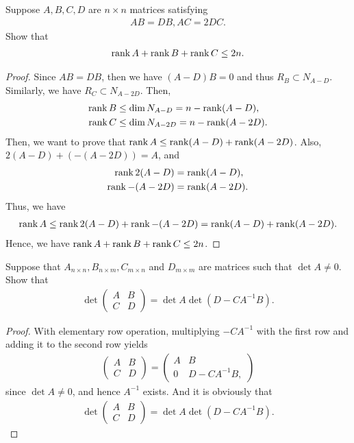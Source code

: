 \documentclass[12pt]{article}
\begin{document}
\medskip

Suppose $A, B, C, D$ are $n \times n$ matrices satisfying
\begin{align*}
    AB = DB, AC = 2 DC.
\end{align*}
Show that
\begin{align*}
    \rank A + \rank B + \rank C \leq 2n.
\end{align*}
\begin{proof}
Since $AB = DB$, then we have $(A - D)B = 0$ and thus $R_B \subset N_{A-D}$. Similarly, we have $R_C \subset N_{A-2D}$. Then,
\begin{align*}
    \rank B & \leq \dim N_{A - D} = n -  \rank (A - D), \\
    \rank C & \leq \dim N_{A - 2D} = n - \rank (A - 2D).
\end{align*}
Then, we want to prove that $\rank A \leq \rank (A - D) + \rank (A - 2D)$. Also, $2(A - D) + (-(A - 2D)) = A$, and
\begin{align*}
    \rank 2(A - D) & = \rank (A - D), \\
    \rank -(A - 2D) & = \rank (A - 2D).
\end{align*}
Thus, we have
\begin{align*}
    \rank A \leq \rank 2(A - D) + \rank -(A - 2D) = \rank (A - D) + \rank (A - 2D).
\end{align*}
Hence, we have $\rank A + \rank B + \rank C \leq 2n$.
\end{proof}

\medskip

Suppose that $A_{n\times n}, B_{n\times m}, C_{m\times n}$ and $D_{m\times m}$ are matrices such that $\det A \neq 0$. Show that
\begin{align*}
    \det \begin{pmatrix}
        A & B \\
        C & D
    \end{pmatrix} = \det A \det \left( D - C A^{-1} B\right).
\end{align*}
\begin{proof}
With elementary row operation, multiplying $- C A^{-1}$ with the first row and adding it to the second row yields
\begin{align*}
    \begin{pmatrix}
        A & B \\
        C & D
    \end{pmatrix} = \begin{pmatrix}
        A & B \\
        0 & D - C A^{-1} B,
    \end{pmatrix}
\end{align*}
since $\det A \neq 0$, and hence $A^{-1}$ exists. And it is obviously that
\begin{align*}
    \det \begin{pmatrix}
        A & B \\
        C & D
    \end{pmatrix} = \det A \det \left( D - C A^{-1} B\right).
\end{align*}
\end{proof}
\end{document}
